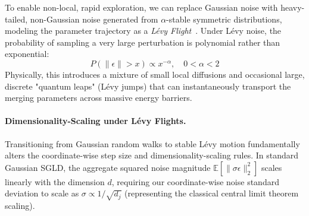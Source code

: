 \documentclass{article}
\theoremstyle{plain}
\theoremstyle{definition}
\theoremstyle{remark}
\begin{document}
To enable non-local, rapid exploration, we can replace Gaussian noise with heavy-tailed, non-Gaussian noise generated from $\alpha$-stable symmetric distributions, modeling the parameter trajectory as a \emph{Lévy Flight}~\cite{neal2011mcmc}. Under Lévy noise, the probability of sampling a very large perturbation is polynomial rather than exponential:
\begin{equation}
    P\left(\|\epsilon\| > x\right) \propto x^{-\alpha}, \quad 0 < \alpha < 2
\end{equation}
Physically, this introduces a mixture of small local diffusions and occasional large, discrete "quantum leaps" (Lévy jumps) that can instantaneously transport the merging parameters across massive energy barriers. 

\paragraph{Dimensionality-Scaling under Lévy Flights.} Transitioning from Gaussian random walks to stable Lévy motion fundamentally alters the coordinate-wise step size and dimensionality-scaling rules. In standard Gaussian SGLD, the aggregate squared noise magnitude $\mathbb{E}[\|\sigma \epsilon\|_2^2]$ scales linearly with the dimension $d$, requiring our coordinate-wise noise standard deviation to scale as $\sigma \propto 1/\sqrt{d_j}$ (representing the classical central limit theorem scaling). 
\end{document}

